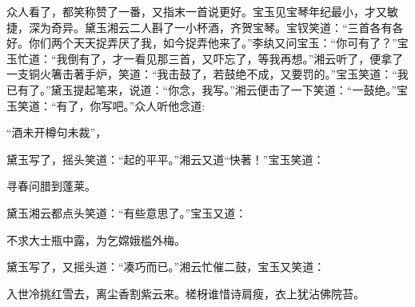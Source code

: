 \begin{parag}
    众人看了，都笑称赞了一番，又指末一首说更好。宝玉见宝琴年纪最小，才又敏捷，深为奇异。黛玉湘云二人斟了一小杯酒，齐贺宝琴。宝钗笑道：“三首各有各好。你们两个天天捉弄厌了我，如今捉弄他来了。”李纨又问宝玉：“你可有了？”宝玉忙道：“我倒有了，才一看见那三首，又吓忘了，等我再想。”湘云听了，便拿了一支铜火箸击著手炉，笑道：“我击鼓了，若鼓绝不成，又要罚的。”宝玉笑道：“我已有了。”黛玉提起笔来，说道：“你念，我写。”湘云便击了一下笑道：“一鼓绝。”宝玉笑道：“有了，你写吧。”众人听他念道:
\end{parag}

\begin{poem}
    \begin{pl}
        “酒未开樽句未裁”，
    \end{pl}
\end{poem}


\begin{parag}
    黛玉写了，摇头笑道：“起的平平。”湘云又道“快著！”宝玉笑道：
\end{parag}


\begin{poem}
    \begin{pl} 寻春问腊到蓬莱。\end{pl}
\end{poem}

\begin{parag}
    黛玉湘云都点头笑道：“有些意思了。”宝玉又道：
\end{parag}


\begin{poem}
    \begin{pl}
        不求大士瓶中露，为乞嫦娥槛外梅。
    \end{pl}
\end{poem}


\begin{parag}
    黛玉写了，又摇头道：“凑巧而已。”湘云忙催二鼓，宝玉又笑道：
\end{parag}


\begin{poem}
    \begin{pl}入世冷挑红雪去，离尘香割紫云来。槎枒谁惜诗肩瘦，衣上犹沾佛院苔。\end{pl}
\end{poem}


